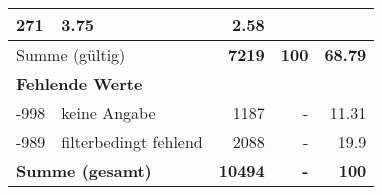 \begin{longtable}{lXrrr}
       \num{271} &
       \num[round-mode=places,round-precision=2]{3.75} &
         \num[round-mode=places,round-precision=2]{2.58} \\
     \midrule
     \multicolumn{2}{l}{Summe (gültig)} &
       \textbf{\num{7219}} &
     \textbf{\num{100}} &
       \textbf{\num[round-mode=places,round-precision=2]{68.79}} \\
     \multicolumn{5}{l}{\textbf{Fehlende Werte}}\\
       -998 &
       keine Angabe &
         \num{1187} &
        - &
         \num[round-mode=places,round-precision=2]{11.31} \\
       -989 &
       filterbedingt fehlend &
         \num{2088} &
        - &
         \num[round-mode=places,round-precision=2]{19.9} \\
     \midrule
     \multicolumn{2}{l}{\textbf{Summe (gesamt)}} &
          \textbf{\num{10494}} &
        \textbf{-} &
        \textbf{\num{100}} \\
     \bottomrule
     \end{longtable}
     
